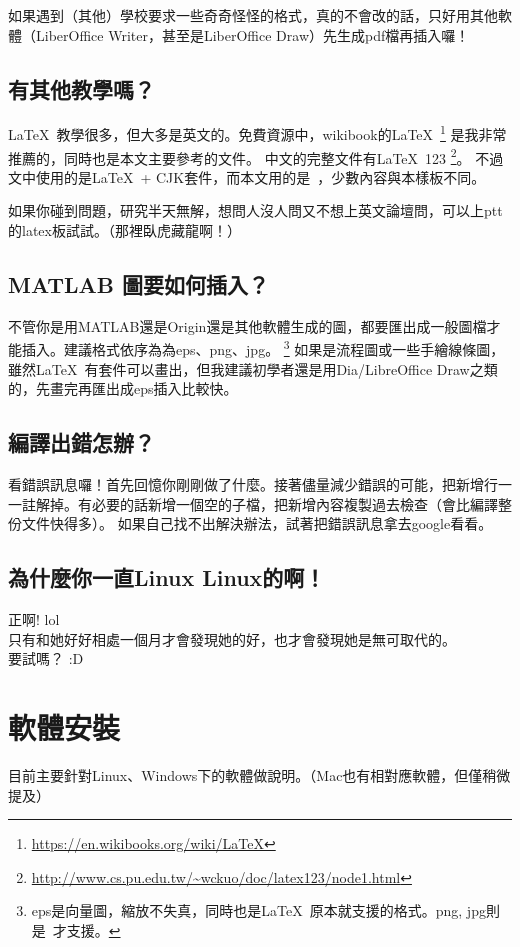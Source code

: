 \documentclass[class=NCU_thesis, crop=false, float=true]{standalone}
\begin{document}
如果遇到（其他）學校要求一些奇奇怪怪的格式，真的不會改的話，只好用其他軟體（LiberOffice Writer，甚至是LiberOffice Draw）先生成pdf檔再插入囉！
        
\section{有其他教學嗎？}
\LaTeX\ 教學很多，但大多是英文的。免費資源中，wikibook的\LaTeX\ 
\footnote{\url{https://en.wikibooks.org/wiki/LaTeX}}
是我非常推薦的，同時也是本文主要參考的文件。
中文的完整文件有\LaTeX\ 123
\footnote{\url{http://www.cs.pu.edu.tw/~wckuo/doc/latex123/node1.html}}。
不過文中使用的是\LaTeX\ + CJK套件，而本文用的是\XeLaTeX\ ，少數內容與本樣板不同。

如果你碰到問題，研究半天無解，想問人沒人問又不想上英文論壇問，可以上ptt的latex板試試。（那裡臥虎藏龍啊！）

\section{MATLAB 圖要如何插入？}
不管你是用MATLAB還是Origin還是其他軟體生成的圖，都要匯出成一般圖檔才能插入。建議格式依序為為eps、png、jpg。
\footnote{eps是向量圖，縮放不失真，同時也是\LaTeX\ 原本就支援的格式。png, jpg則是\XeLaTeX\ 才支援。}
如果是流程圖或一些手繪線條圖，雖然\LaTeX\ 有套件可以畫出，但我建議初學者還是用Dia/LibreOffice Draw之類的，先畫完再匯出成eps插入比較快。

\section{編譯出錯怎辦？}
看錯誤訊息囉！首先回憶你剛剛做了什麼。接著儘量減少錯誤的可能，把新增行一一註解掉。有必要的話新增一個空的子檔，把新增內容複製過去檢查（會比編譯整份文件快得多）。
如果自己找不出解決辦法，試著把錯誤訊息拿去google看看。

\section{為什麼你一直Linux Linux的啊！}
正啊! lol \\
只有和她好好相處一個月才會發現她的好，也才會發現她是無可取代的。 \\

\noindent 要試嗎？ :D



\chapter{軟體安裝}
\label{sec:c_install}
目前主要針對Linux、Windows下的軟體做說明。（Mac也有相對應軟體，但僅稍微提及）
\end{document}
